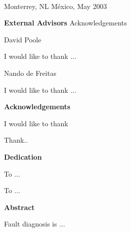 \begin{center}
\\
\vspace*{0.7 cm}
Monterrey, NL M\'exico, May 2003
\end{center}

\newpage %

\Huge {\bf External Advisors} \Large { Acknowledgements} \\
\normalsize

\vspace*{2.0 cm}
\Large {David Poole}
\vspace*{1.0 cm}
\normalsize

I would like to thank ...

\vspace*{2.0 cm}
\Large {Nando de Freitas}
\vspace*{1.0 cm}
\normalsize

I would like to thank ...


\vspace*{1.0 cm}




\newpage %

\Huge {\bf Acknowledgements} \\
\normalsize

I would like to thank


\vspace*{1.0 cm}

\large Thank..\normalsize

\newpage %

\Huge {\bf Dedication}

\vspace*{7.0 cm}

\begin{center}
\large To ...

\vspace*{3.0 cm}

To ...
\end{center}

\normalsize


\newpage %

\Huge{{\bf Abstract}} \\
\normalsize

\vspace*{4.0 cm}

Fault diagnosis is ...

\newpage %

\tableofcontents
\listoftables
\listoffigures
\newpage

